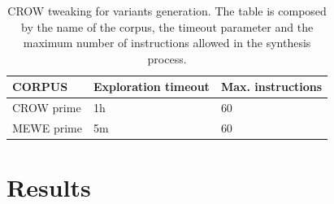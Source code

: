 \begin{table}[H]
    \renewcommand{\arraystretch}{1.2}
    \centering
    \begin{tabular}{l | l l}
        \midrule
        CORPUS & Exploration timeout & Max. instructions \\
        \hline
        CROW prime & 1h & 60 \\
        MEWE prime & 5m & 60 \\
    \end{tabular}
    \caption{CROW tweaking for variants generation. The table is composed by the name of the corpus, the timeout parameter and the maximum number of instructions allowed in the synthesis process.}
    \label{table:corpora:setup}
\end{table}








\section{Results}

